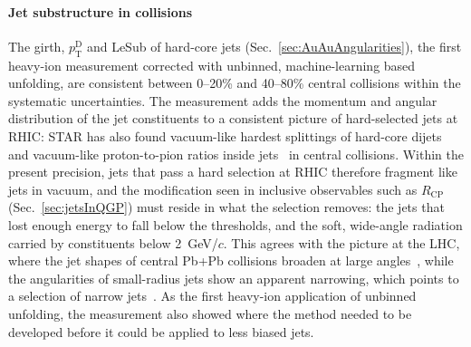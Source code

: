 \paragraph{Jet substructure in \AuAu collisions}
The girth, \(p_\mathrm{T}^\mathrm{D}\) and LeSub of hard-core jets (Sec.~\ref{sec:AuAuAngularities}), the first heavy-ion measurement corrected with unbinned, machine-learning based unfolding, are consistent between 0--20\% and 40--80\% central collisions within the systematic uncertainties.
%
The measurement adds the momentum and angular distribution of the jet constituents to a consistent picture of hard-selected jets at RHIC: STAR has also found vacuum-like hardest splittings of hard-core dijets~\cite{PhysRevC.105.044906} and vacuum-like proton-to-pion ratios inside jets~\cite{STAR:2026liw} in central \AuAu collisions.
%
Within the present precision, jets that pass a hard selection at RHIC therefore fragment like jets in vacuum, and the modification seen in inclusive observables such as \(R_\mathrm{CP}\) (Sec.~\ref{sec:jetsInQGP}) must reside in what the selection removes: the jets that lost enough energy to fall below the thresholds, and the soft, wide-angle radiation carried by constituents below 2~GeV/\(c\).
%
This agrees with the picture at the LHC, where the jet shapes of central Pb+Pb collisions broaden at large angles~\cite{Chatrchyan:1605718}, while the angularities of small-radius jets show an apparent narrowing, which points to a selection of narrow jets~\cite{Alice2018}.
%
As the first heavy-ion application of unbinned unfolding, the measurement also showed where the method needed to be developed before it could be applied to less biased jets.

